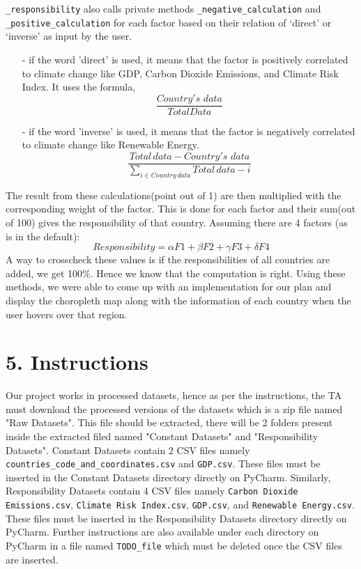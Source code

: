 \documentclass[fontsize=11pt]{article}
\begin{document}
    \texttt{\_responsibility} also calls private methods \texttt{\_negative\_calculation} and \texttt{\_positive\_calculation} for each factor based on
    their relation of ‘direct’ or ‘inverse’ as input by the user.\newline
    \begin{enumerate}
        \item [-] if the word 'direct' is used, it means that the factor is positively correlated to climate change like
        GDP, Carbon Dioxide Emissions, and Climate Risk Index. It uses the formula,
        \[
            \frac{Country's \, \, data}{Total Data}
        \]

        \item [-] if the word 'inverse' is used, it means that the factor is negatively correlated to climate change like
        Renewable Energy.
        \[
            \frac{Total \, data - Country's \, \, data}{\displaystyle\sum_{i \in Country \, data} Total \, data - i }
        \]
    \end{enumerate}
    The result from these calculations(point out of 1) are then multiplied with the corresponding weight of the factor.
    This is done for each factor and their sum(out of 100) gives the responsibility of that country. Assuming there are 4 factors (as is in the default):
    \[
        Responsibility = \alpha F1 + \beta F2 + \gamma F3 + \delta F4
    \]
    A way to crosscheck these values
    is if the responsibilities of all countries are added, we get 100\%. Hence we know that the computation is right.
    \newline
    Using these methods, we were able to come up with an implementation for our plan and display the
    choropleth map along with the information of each country when the user hovers over that region.\newline

    \section*{5. Instructions}
    Our project works in processed datasets, hence as per the instructions, the TA must download the processed versions
    of the datasets which is a zip file named "Raw Datasets". This file should be extracted, there will be 2 folders present
    inside the extracted filed named "Constant Datasets" and "Responsibility Datasets". Constant Datasets contain 2 CSV files
    namely \texttt{countries\_code\_and\_coordinates.csv} and \texttt{GDP.csv}. These files must be inserted in the Constant Datasets
    directory directly on PyCharm. Similarly, Responsibility Datasets contain 4 CSV files namely \texttt{Carbon Dioxide Emissions.csv},
    \texttt{Climate Risk Index.csv}, \texttt{GDP.csv}, and \texttt{Renewable Energy.csv}. These files must be inserted in the Responsibility Datasets
    directory directly on PyCharm. Further instructions are also available under each directory on PyCharm in a file named \texttt{TODO\_file} which
    must be deleted once the CSV files are inserted.\newline
\end{document}

